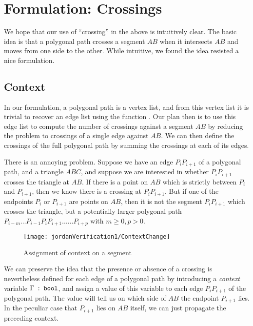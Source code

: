 
\section{Formulation: Crossings}
We hope that our use of ``crossing'' in the above is intuitively clear. The basic idea is that a polygonal path crosses a segment $AB$ when it intersects $AB$ and moves from one side to the other. While intuitive, we found the idea resisted a nice formulation.

\subsection{Context}
In our formulation, a polygonal path is a vertex list, and from this vertex list it is trivial to recover an edge list using the function . Our plan then is to use this edge list to compute the number of crossings against a segment $AB$ by reducing the problem to crossings of a single edge against $AB$. We can then define the crossings of the full polygonal path by summing the crossings at each of its edges. 

There is an annoying problem. Suppose we have an edge $P_iP_{i+1}$ of a polygonal path, and a triangle $ABC$, and suppose we are interested in whether $P_iP_{i+1}$ crosses the triangle at $AB$. If there is a point on $AB$ which is strictly between $P_i$ and $P_{i+1}$, then we know there is a crossing at $P_iP_{i+1}$. But if one of the endpoints $P_{i}$ or $P_{i+1}$ are points on $AB$, then it is not the segment $P_iP_{i+1}$ which crosses the triangle, but a potentially larger polygonal path $P_{i-m}\ldots P_{i-1}P_iP_{i+1}\ldots...P_{i+p}$ with $m \geq 0, p > 0$. 

\begin{figure}
\centering\texttt{[image: jordanVerification1/ContextChange]}
\caption{Assignment of context on a segment}
\label{fig:ContextChanges}
\end{figure}

We can preserve the idea that the presence or absence of a crossing is nevertheless defined for each edge of a polygonal path by introducing a \emph{context} variable $\Gamma\;:\;\texttt{bool}$, and assign a value of this variable to each edge $P_iP_{i+1}$ of the polygonal path. The value will tell us on which side of $AB$ the endpoint $P_{i+1}$ lies. In the peculiar case that $P_{i+1}$ lies on $AB$ itself, we can just propagate the preceding context.

